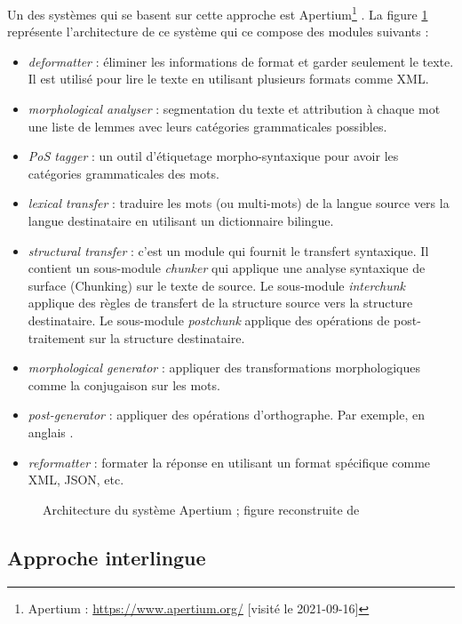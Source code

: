 \documentclass{KodeBook}
\begin{document}
Un des systèmes qui se basent sur cette approche est Apertium\footnote{Apertium : \url{https://www.apertium.org/} [visité le 2021-09-16]} \cite{11-forcada-al}.
La figure \ref{fig:apertium-arch} représente l'architecture de ce système qui ce compose des modules suivants :
\begin{itemize}
	\item \textit{deformatter} : éliminer les informations de format et garder seulement le texte. 
	Il est utilisé pour lire le texte en utilisant plusieurs formats comme XML.
	\item \textit{morphological analyser} : segmentation du texte et attribution à chaque mot une liste de lemmes avec leurs catégories grammaticales possibles.
	\item \textit{PoS tagger} : un outil d'étiquetage morpho-syntaxique pour avoir les catégories grammaticales des mots.
	\item \textit{lexical transfer} : traduire les mots (ou multi-mots) de la langue source vers la langue destinataire en utilisant un dictionnaire bilingue.
	\item \textit{structural transfer} : c'est un module qui fournit le transfert syntaxique. 
	Il contient un sous-module \textit{chunker} qui applique une analyse syntaxique de surface (Chunking) sur le texte de source. 
	Le sous-module \textit{interchunk} applique des règles de transfert de la structure source vers la structure destinataire. 
	Le sous-module \textit{postchunk} applique des opérations de post-traitement sur la structure destinataire.
	\item \textit{morphological generator} : appliquer des transformations morphologiques comme la conjugaison sur les mots. 
	\item \textit{post-generator} : appliquer des opérations d'orthographe. 
	Par exemple, en anglais .
	\item \textit{reformatter} : formater la réponse en utilisant un format spécifique comme XML, JSON, etc.
\end{itemize}

\begin{figure}[!ht]
	\centering
	\caption[Architecture du système Apertium]{Architecture du système Apertium ; figure reconstruite de \cite{11-forcada-al}}
	\label{fig:apertium-arch}
\end{figure}

\subsection{Approche interlingue}
\end{document}
